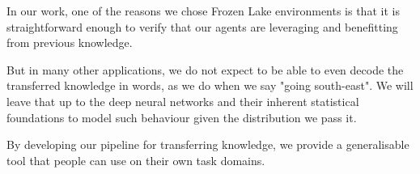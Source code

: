 In our work, one of the reasons we chose Frozen Lake environments is that it is straightforward enough to verify that our agents are leveraging and benefitting from previous knowledge.

But in many other applications, we do not expect to be able to even decode the transferred knowledge in words, as we do when we say "going south-east". We will leave that up to the deep neural networks and their inherent statistical foundations to model such behaviour given the distribution we pass it.

By developing our pipeline for transferring knowledge, we provide a generalisable tool that people can use on their own task domains.

